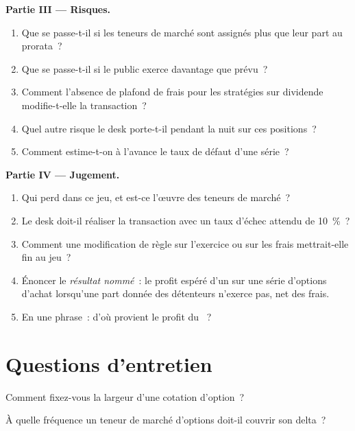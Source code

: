 \begin{problem}
\medskip\noindent\textbf{Partie III --- Risques.}
\begin{enumerate}[resume]
\item Que se passe-t-il si les teneurs de marché sont assignés plus que leur part au prorata~?
\item Que se passe-t-il si le public exerce davantage que prévu~?
\item Comment l'absence de plafond de frais pour les stratégies sur dividende modifie-t-elle la transaction~?
\item Quel autre risque le desk porte-t-il pendant la nuit sur ces positions~?
\item Comment estime-t-on à l'avance le taux de défaut d'une série~?
\end{enumerate}

\medskip\noindent\textbf{Partie IV --- Jugement.}
\begin{enumerate}[resume]
\item Qui perd dans ce jeu, et est-ce l'œuvre des teneurs de marché~?
\item Le desk doit-il réaliser la transaction avec un taux d'échec attendu de 10~\%~?
\item Comment une modification de règle sur l'exercice ou sur les frais mettrait-elle fin au jeu~?
\item Énoncer le \emph{résultat nommé}~: le profit espéré d'un  sur une série d'options d'achat lorsqu'une part donnée des détenteurs n'exerce pas, net des frais.
\item En une phrase~: d'où provient le profit du ~?
\end{enumerate}
\end{problem}

\section{Questions d'entretien}

\begin{interviewq}\label{iq:dv:options-market-making-in-practice:1}
Comment fixez-vous la largeur d'une cotation d'option~?
\end{interviewq}

\begin{interviewq}\label{iq:dv:options-market-making-in-practice:2}
À quelle fréquence un teneur de marché d'options doit-il couvrir son delta~?
\end{interviewq}

